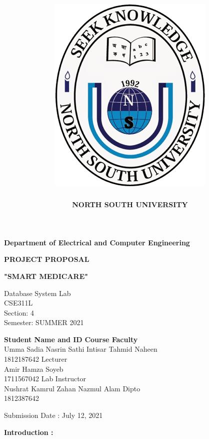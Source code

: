 \documentclass{article}
\title{\includegraphics[width=.3\textwidth]{unnamed.png}}
\author{\textbf{\LARGE{NORTH SOUTH UNIVERSITY}}}
\date{}
\begin{document}
\maketitle

\begin{center}
\vspace{-5mm}

\large{\textbf{Department of Electrical and Computer Engineering}}\\
\vspace{20pt}

\textbf{\LARGE{PROJECT PROPOSAL}}\\
\vspace{20pt}

\textbf{\LARGE{"SMART MEDICARE"}}\\
\vspace{20pt}

Database System Lab\\
CSE311L\\
Section: 4\\
Semester: SUMMER 2021\\
\vspace{25pt}

\end{center}
\textbf{Student Name and ID} \textbf{\hspace{56mm}Course Faculty}\\
Umma Sadia Nasrin Sathi \hspace{45mm}Intisar Tahmid Naheen\\
1812187642 \hspace{90mm}Lecturer\\
Amir Hamza Soyeb \\
1711567042 \hspace{80mm}Lab Instructor\\
Nushrat Kamrul Zahan \hspace{55mm}Nazmul Alam Dipto\\
1812387642\\

\vspace{15pt}
\begin{center}
Submission Date : July 12, 2021
\end{center}

\newpage


\Large{\textbf{Introduction : }}\\
\end{document}
